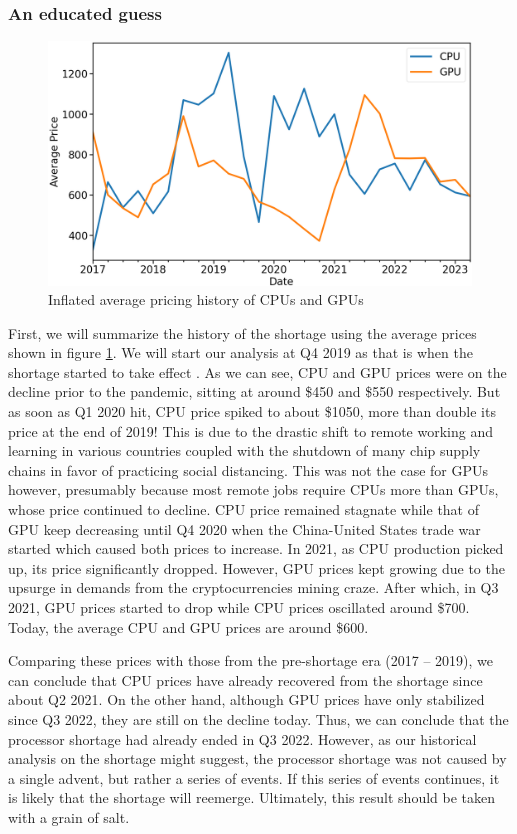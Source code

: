 \documentclass[conference]{IEEEtran}
\begin{document}
\subsubsection{An educated guess}
\begin{figure}[htbp]
	\centerline{\includegraphics[width=\columnwidth]{avg_price.png}}
	\caption{Inflated average pricing history of CPUs and GPUs}
	\label{fig3}
\end{figure}
First, we will summarize the history of the shortage using the average prices
shown in figure \ref{fig3}. We will start our analysis at Q4 2019 as that is
when the shortage started to take effect \cite{Wikipedia:2023}. As we can see,
CPU and GPU prices
were on the decline prior to the pandemic, sitting at around \$450 and \$550
respectively. But as soon as Q1 2020 hit, CPU price spiked to about \$1050,
more than double its price at the end of 2019! This is due to the drastic
shift to remote working and learning in various countries coupled with the
shutdown of many chip supply chains in favor of practicing social distancing.
This was not the case for GPUs however, presumably because most remote jobs
require CPUs more than GPUs, whose price continued to decline. CPU price
remained stagnate while that of GPU keep decreasing until Q4 2020 when the
China-United States trade war started which caused both prices to increase.
In 2021, as CPU production picked up, its price significantly dropped.
However, GPU prices kept growing due to the upsurge in demands from the
cryptocurrencies mining craze. After which, in Q3 2021, GPU prices started
to drop while CPU prices oscillated around \$700. Today, the average CPU and
GPU prices are around \$600.

Comparing these prices with those from the pre-shortage era (2017 -- 2019), we
can conclude that CPU prices have already recovered from the shortage since
about Q2 2021. On the other hand, although GPU prices have only stabilized
since Q3 2022, they are still on the decline today. Thus, we can conclude that
the processor shortage had already ended in Q3 2022. However, as our historical
analysis on the shortage might suggest, the processor shortage was not caused
by a single advent, but rather a series of events. If this series of events
continues, it is likely that the shortage will reemerge. Ultimately, this
result should be taken with a grain of salt.
\end{document}
